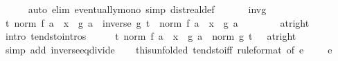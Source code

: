 \begin{isabellebody}
\ \ \ \ \isamarkupfalse%
\ {\isacharparenleft}{\kern0pt}auto\ elim{\isacharbang}{\kern0pt}{\isacharcolon}{\kern0pt}\ eventually{\isacharunderscore}{\kern0pt}mono\ simp{\isacharcolon}{\kern0pt}\ dist{\isacharunderscore}{\kern0pt}real{\isacharunderscore}{\kern0pt}def{\isacharparenright}{\kern0pt}\isanewline
\isanewline
\ \ \isamarkupfalse%
\isanewline
\ \ \isamarkupfalse%
\ inv{\isacharunderscore}{\kern0pt}g\ \isamarkupfalse%
\ {\isachardoublequoteopen}{\isacharparenleft}{\kern0pt}{\isacharparenleft}{\kern0pt}{\isasymlambda}t{\isachardot}{\kern0pt}\ norm\ {\isacharparenleft}{\kern0pt}{\isacharparenleft}{\kern0pt}f\ a\ {\isacharminus}{\kern0pt}\ x\ {\isacharasterisk}{\kern0pt}\ g\ a{\isacharparenright}{\kern0pt}\ {\isacharasterisk}{\kern0pt}\ inverse\ {\isacharparenleft}{\kern0pt}g\ t{\isacharparenright}{\kern0pt}{\isacharparenright}{\kern0pt}{\isacharparenright}{\kern0pt}\ {\isasymlonglongrightarrow}\ norm\ {\isacharparenleft}{\kern0pt}{\isacharparenleft}{\kern0pt}f\ a\ {\isacharminus}{\kern0pt}\ x\ {\isacharasterisk}{\kern0pt}\ g\ a{\isacharparenright}{\kern0pt}\ {\isacharasterisk}{\kern0pt}\ {}{\isacharparenright}{\kern0pt}{\isacharparenright}{\kern0pt}\isanewline
\ \ \ \ \ \ {\isacharparenleft}{\kern0pt}at{\isacharunderscore}{\kern0pt}right\ {}{\isacharparenright}{\kern0pt}{\isachardoublequoteclose}\isanewline
\ \ \ \ \isamarkupfalse%
\ {\isacharparenleft}{\kern0pt}intro\ tendsto{\isacharunderscore}{\kern0pt}intros{\isacharparenright}{\kern0pt}\isanewline
\ \ \isamarkupfalse%
\ \isamarkupfalse%
\ {\isachardoublequoteopen}{\isacharparenleft}{\kern0pt}{\isacharparenleft}{\kern0pt}{\isasymlambda}t{\isachardot}{\kern0pt}\ norm\ {\isacharparenleft}{\kern0pt}f\ a\ {\isacharminus}{\kern0pt}\ x\ {\isacharasterisk}{\kern0pt}\ g\ a{\isacharparenright}{\kern0pt}\ {\isacharslash}{\kern0pt}\ norm\ {\isacharparenleft}{\kern0pt}g\ t{\isacharparenright}{\kern0pt}{\isacharparenright}{\kern0pt}\ {\isasymlonglongrightarrow}\ {}{\isacharparenright}{\kern0pt}\ {\isacharparenleft}{\kern0pt}at{\isacharunderscore}{\kern0pt}right\ {}{\isacharparenright}{\kern0pt}{\isachardoublequoteclose}\isanewline
\ \ \ \ \isamarkupfalse%
\ {\isacharparenleft}{\kern0pt}simp\ add{\isacharcolon}{\kern0pt}\ inverse{\isacharunderscore}{\kern0pt}eq{\isacharunderscore}{\kern0pt}divide{\isacharparenright}{\kern0pt}\isanewline
\ \ \isamarkupfalse%
\ this{\isacharbrackleft}{\kern0pt}unfolded\ tendsto{\isacharunderscore}{\kern0pt}iff{\isacharcomma}{\kern0pt}\ rule{\isacharunderscore}{\kern0pt}format{\isacharcomma}{\kern0pt}\ of\ {\isachardoublequoteopen}e\ {\isacharslash}{\kern0pt}\ {}{\isachardoublequoteclose}{\isacharbrackright}{\kern0pt}\ {\isacartoucheopen}{}\ {\isacharless}{\kern0pt}\ e{\isacartoucheclose}\isanewline

\end{isabellebody}
